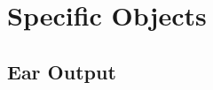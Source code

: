 \documentclass[letterpaper,10pt,english]{sphinxmanual}
\begin{document}
\begin{fulllineitems}
\begin{fulllineitems}
\begin{description}
\end{description}

\end{fulllineitems}


\end{fulllineitems}



\section{Specific Objects}
\label{\detokenize{specific:specific-objects}}\label{\detokenize{specific::doc}}

\subsection{Ear Output}
\label{\detokenize{specific:module-EarOutput}}\label{\detokenize{specific:ear-output}}
\end{document}
